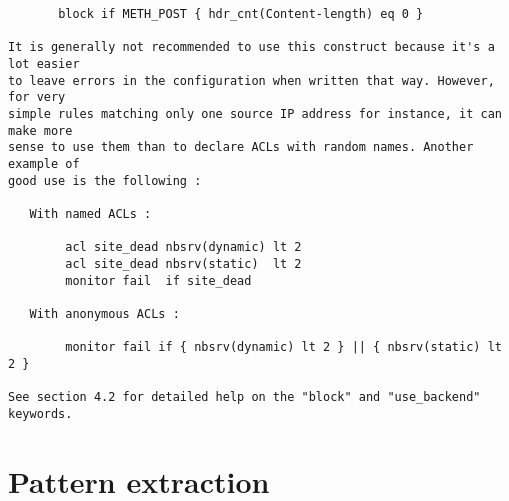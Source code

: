 \begin{verbatim}
       block if METH_POST { hdr_cnt(Content-length) eq 0 }

It is generally not recommended to use this construct because it's a lot easier
to leave errors in the configuration when written that way. However, for very
simple rules matching only one source IP address for instance, it can make more
sense to use them than to declare ACLs with random names. Another example of
good use is the following :

   With named ACLs :

        acl site_dead nbsrv(dynamic) lt 2
        acl site_dead nbsrv(static)  lt 2
        monitor fail  if site_dead

   With anonymous ACLs :

        monitor fail if { nbsrv(dynamic) lt 2 } || { nbsrv(static) lt 2 }

See section 4.2 for detailed help on the "block" and "use_backend" keywords.
\end{verbatim}

\section{Pattern extraction}

